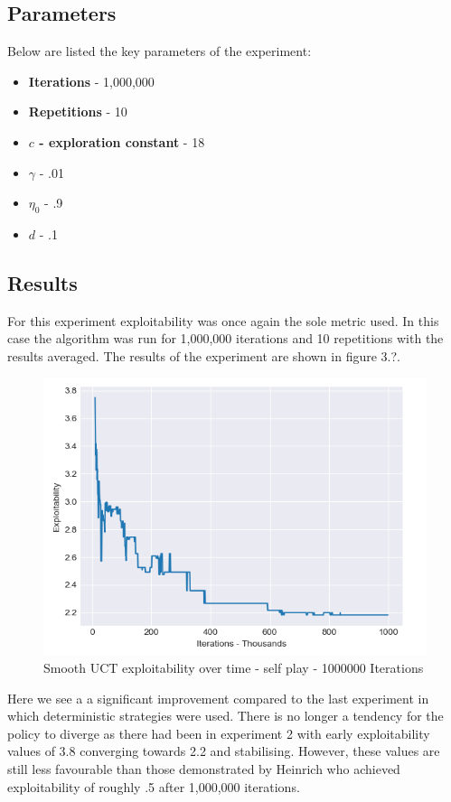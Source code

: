 \subsection{Parameters}\label{subsec:algAndCoding3}
Below are listed the key parameters of the experiment:
\begin{itemize}
    \item \textbf{Iterations} - 1,000,000
    \item \textbf{Repetitions} - 10
    \item \textbf{$c$ - exploration constant} - 18
    \item \textbf{$\gamma$} - .01
    \item \textbf{$\eta_0$} - .9
    \item \textbf{$d$} - .1
\end{itemize}
\subsection{Results}\label{subsec:results3}
For this experiment exploitability was once again the sole metric used.
In this case the algorithm was run for 1,000,000 iterations and 10 repetitions with the results averaged.
The results of the experiment are shown in figure 3.?.
\begin{figure}[!ht]
    \includegraphics[scale=.7]{images/exploitability_self-play_stochastic_1000000.png}
    \caption{Smooth UCT exploitability over time - self play - 1000000 Iterations}
\end{figure}

Here we see a a significant improvement compared to the last experiment in which deterministic strategies were used.
There is no longer a tendency for the policy to diverge as there had been in experiment 2 with
early exploitability values of 3.8 converging towards 2.2 and stabilising.
However, these values are still less favourable than those demonstrated by Heinrich who achieved
exploitability of roughly .5 after 1,000,000 iterations.


